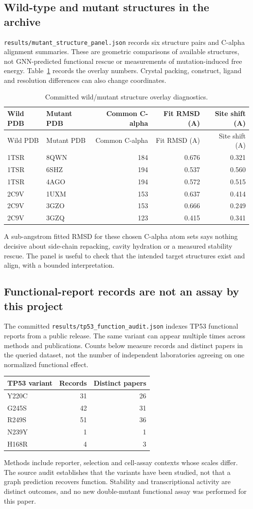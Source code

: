 \subsection{Wild-type and mutant structures in the archive}
\texttt{results/mutant\_structure\_panel.json} records six structure pairs and C-alpha alignment summaries. These are geometric comparisons of available structures, not GNN-predicted functional rescue or measurements of mutation-induced free energy. Table~\ref{tab:structures} records the overlay numbers. Crystal packing, construct, ligand and resolution differences can also change coordinates.
\begin{longtable}{llrrr}
\caption{Committed wild/mutant structure overlay diagnostics.}\label{tab:structures}\\
\hline Wild PDB & Mutant PDB & Common C-alpha & Fit RMSD (A) & Site shift (A)\\\hline\endfirsthead
\hline Wild PDB & Mutant PDB & Common C-alpha & Fit RMSD (A) & Site shift (A)\\\hline\endhead
1TSR & 8QWN & 184 & 0.676 & 0.321\\
1TSR & 6SHZ & 194 & 0.537 & 0.560\\
1TSR & 4AGO & 194 & 0.572 & 0.515\\
2C9V & 1UXM & 153 & 0.637 & 0.414\\
2C9V & 3GZO & 153 & 0.666 & 0.249\\
2C9V & 3GZQ & 123 & 0.415 & 0.341\\
\hline\end{longtable}
A sub-angstrom fitted RMSD for these chosen C-alpha atom sets says nothing decisive about side-chain repacking, cavity hydration or a measured stability rescue. The panel is useful to check that the intended target structures exist and align, with a bounded interpretation.
\subsection{Functional-report records are not an assay by this project}
The committed \texttt{results/tp53\_function\_audit.json} indexes TP53 functional reports from a public release. The same variant can appear multiple times across methods and publications. Counts below measure records and distinct papers in the queried dataset, not the number of independent laboratories agreeing on one normalized functional effect.
\begin{center}\begin{tabular}{lrr}\hline TP53 variant & Records & Distinct papers\\\hline
Y220C & 31 & 26\\
G245S & 42 & 31\\
R249S & 51 & 36\\
N239Y & 1 & 1\\
H168R & 4 & 3\\
\hline\end{tabular}\end{center}
Methods include reporter, selection and cell-assay contexts whose scales differ. The source audit establishes that the variants have been studied, not that a graph prediction recovers function. Stability and transcriptional activity are distinct outcomes, and no new double-mutant functional assay was performed for this paper.
